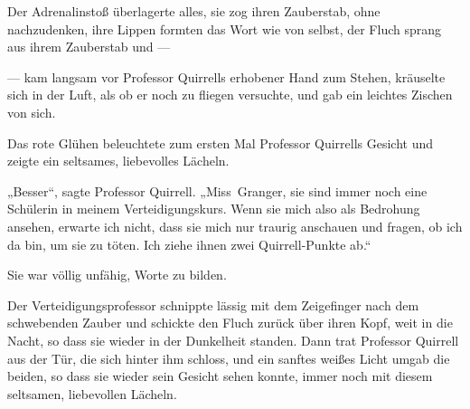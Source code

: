 
Der Adrenalinstoß überlagerte alles, sie zog ihren Zauberstab, ohne nachzudenken, ihre Lippen formten das Wort wie von selbst, der Fluch sprang aus ihrem Zauberstab und —

— kam langsam vor Professor Quirrells erhobener Hand zum Stehen, kräuselte sich in der Luft, als ob er noch zu fliegen versuchte, und gab ein leichtes Zischen von sich.

Das rote Glühen beleuchtete zum ersten Mal Professor Quirrells Gesicht und zeigte ein seltsames, liebevolles Lächeln.

„Besser“, sagte Professor Quirrell.
„Miss~Granger, sie sind immer noch eine Schülerin in meinem Verteidigungskurs. Wenn sie mich also als Bedrohung ansehen, erwarte ich nicht, dass sie mich nur traurig anschauen und fragen, ob ich da bin, um sie zu töten. Ich ziehe ihnen zwei Quirrell-Punkte ab.“

Sie war völlig unfähig, Worte zu bilden.

Der Verteidigungsprofessor schnippte lässig mit dem Zeigefinger nach dem schwebenden Zauber und schickte den Fluch zurück über ihren Kopf, weit in die Nacht, so dass sie wieder in der Dunkelheit standen. Dann trat Professor Quirrell aus der Tür, die sich hinter ihm schloss, und ein sanftes weißes Licht umgab die beiden, so dass sie wieder sein Gesicht sehen konnte, immer noch mit diesem seltsamen, liebevollen Lächeln.

